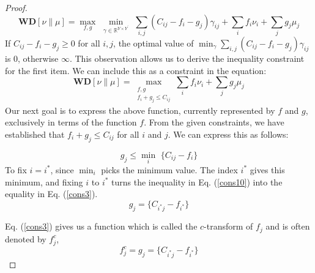 \begin{proof}
\begin{equation*}
\textbf{WD}[\nu \| \mu]=\max_{f, g}\,\, \min_{\gamma \in \mathbb{R}^{Y \times Y^{\prime}}} \,\,\sum_{i,j}(C_{ij}-f_i-g_j)\gamma_{ij}+\sum_i f_i\nu_i+\sum_{j} g_j\mu_j
\end{equation*}
If $C_{ij}-f_i-g_j \geq 0 $ for all $i,j$, the optimal value of $\min_\gamma \sum_{i,j}(C_{ij}-f_i-g_j)\gamma_{ij}$ is 0, otherwise $\infty$. This observation allows us to derive the inequality constraint for the first item. 
We can include this as a constraint in the equation:
\begin{equation*}\label{cons2}
\textbf{WD}[\nu \| \mu]=\max _{\substack{f, g \\ f_i+g_j \leq C_{ij}}} \sum_i f_i\nu_i+\sum_{j} g_j \mu_j
\end{equation*}
Our next goal is to express the above function, currently represented by $f$ and $g$, exclusively in terms of the function $f$. From the given constraints, we have established that $f_i + g_j \leq C_{ij}$ for all $i$ and $j$.
We can express this as follows:



\begin{equation}\label{cons10}
g_j \leq \min _i\,\,\{C_{ij}-f_i\}
\end{equation}
To fix $i = i^*$, since $\min_i$ picks the minimum value. The index $i^*$ gives this minimum, and fixing $i$ to $i^*$ turns the inequality in Eq. (\ref{cons10}) into the equality in Eq. (\ref{cons3}).
\begin{equation}\label{cons3}
g_j=\{C_{i^*j}-f_{i^*}\}
\end{equation}

Eq. (\ref{cons3}) gives us a function which is called the $c$-transform of $f_j$ and is often denoted by $f^c_j$,
\begin{equation*}
f^c_j=g_j=\{C_{i^*j}-f_{i^*}\}
\end{equation*}


\end{proof}
